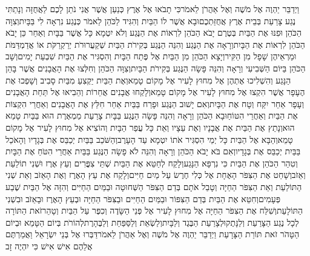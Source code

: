 \documentclass[../main/main.tex]{subfiles}
\begin{document}
\begin{multicols*}{\ncols}
וַיְדַבֵּר יַהְוֶה אֶל מֹשֶׁה וְאֶל אַהֲרֹן לֵאמֹר\PreVerseSpace{}כִּי תָבֹאוּ אֶל אֶרֶץ כְּנַעַן אֲשֶׁר אֲנִי נֹתֵן לָכֶם לַאֲחֻזָּה וְנָתַתִּי נֶגַע צָרַעַת בְּבֵית אֶרֶץ אֲחֻזַּתְכֶם\PreVerseSpace{}וּבָא אֲשֶׁר לוֹ הַבַּיִת וְהִגִּיד לַכֹּהֵן לֵאמֹר כְּנֶגַע נִרְאָה לִי בַּבָּיִת\PreVerseSpace{}וְצִוָּה הַכֹּהֵן וּפִנּוּ אֶת הַבַּיִת בְּטֶרֶם יָבֹא הַכֹּהֵן לִרְאוֹת אֶת הַנֶּגַע וְלֹא יִטְמָא כָּל אֲשֶׁר בַּבָּיִת וְאַחַר כֵּן יָבֹא הַכֹּהֵן לִרְאוֹת אֶת הַבָּיִת\PreVerseSpace{}וְרָאָה אֶת הַנֶּגַע וְהִנֵּה הַנֶּגַע בְּקִירֹת הַבַּיִת שְׁקַעֲרוּרֹת יְרַקְרַקֹּת אוֹ אֲדַמְדַּמֹּת וּמַרְאֵיהֶן שָׁפָל מִן הַקִּיר\PreVerseSpace{}וְיָצָא הַכֹּהֵן מִן הַבַּיִת אֶל פֶּתַח הַבָּיִת וְהִסְגִּיר אֶת הַבַּיִת שִׁבְעַת יָמִים\PreVerseSpace{}וְשָׁב הַכֹּהֵן בַּיּוֹם הַשְּׁבִיעִי וְרָאָה וְהִנֵּה פָּשָׂה הַנֶּגַע בְּקִירֹת הַבָּיִת\PreVerseSpace{}וְצִוָּה הַכֹּהֵן וְחִלְּצוּ אֶת הָאֲבָנִים אֲשֶׁר בָּהֵן הַנָּגַע וְהִשְׁלִיכוּ אֶתְהֶן אֶל מִחוּץ לָעִיר אֶל מָקוֹם טָמֵא\PreVerseSpace{}וְאֶת הַבַּיִת יַקְצִעַ מִבַּיִת סָבִיב וְשָׁפְכוּ אֶת הֶעָפָר אֲשֶׁר הִקְצוּ אֶל מִחוּץ לָעִיר אֶל מָקוֹם טָמֵא\PreVerseSpace{}וְלָקְחוּ אֲבָנִים אֲחֵרוֹת וְהֵבִיאוּ אֶל תַּחַת הָאֲבָנִים וְעָפָר אַחֵר יִקַּח וְטָח אֶת הַבָּיִת\PreVerseSpace{}וְאִם יָשׁוּב הַנֶּגַע וּפָרַח בַּבַּיִת אַחַר חִלֵּץ אֶת הָאֲבָנִים וְאַחֲרֵי הִקְצוֹת אֶת הַבַּיִת וְאַחֲרֵי הִטּוֹחַ\PreVerseSpace{}וּבָא הַכֹּהֵן וְרָאָה וְהִנֵּה פָּשָׂה הַנֶּגַע בַּבָּיִת צָרַעַת מַמְאֶרֶת הוּא בַּבַּיִת טָמֵא הוּא\PreVerseSpace{}וְנָתַץ אֶת הַבַּיִת אֶת אֲבָנָיו וְאֶת עֵצָיו וְאֵת כָּל עֲפַר הַבָּיִת וְהוֹצִיא אֶל מִחוּץ לָעִיר אֶל מָקוֹם טָמֵא\PreVerseSpace{}וְהַבָּא אֶל הַבַּיִת כָּל יְמֵי הִסְגִּיר אֹתוֹ יִטְמָא עַד הָעָרֶב\PreVerseSpace{}וְהַשֹּׁכֵב בַּבַּיִת יְכַבֵּס אֶת בְּגָדָיו וְהָאֹכֵל בַּבַּיִת יְכַבֵּס אֶת בְּגָדָיו\PreVerseSpace{}וְאִם בֹּא יָבֹא הַכֹּהֵן וְרָאָה וְהִנֵּה לֹא פָשָׂה הַנֶּגַע בַּבַּיִת אַחֲרֵי הִטֹּחַ אֶת הַבָּיִת וְטִהַר הַכֹּהֵן אֶת הַבַּיִת כִּי נִרְפָּא הַנָּגַע\PreVerseSpace{}וְלָקַח לְחַטֵּא אֶת הַבַּיִת שְׁתֵּי צִפֳּרִים וְעֵץ אֶרֶז וּשְׁנִי תוֹלַעַת וְאֵזֹב\PreVerseSpace{}וְשָׁחַט אֶת הַצִּפֹּר הָאֶחָת אֶל כְּלִי חֶרֶשׂ עַל מַיִם חַיִּים\PreVerseSpace{}וְלָקַח אֶת עֵץ הָאֶרֶז וְאֶת הָאֵזֹב וְאֵת שְׁנִי הַתּוֹלַעַת וְאֵת הַצִּפֹּר הַחַיָּה וְטָבַל אֹתָם בְּדַם הַצִּפֹּר הַשְּׁחוּטָה וּבַמַּיִם הַחַיִּים וְהִזָּה אֶל הַבַּיִת שֶׁבַע פְּעָמִים\PreVerseSpace{}וְחִטֵּא אֶת הַבַּיִת בְּדַם הַצִּפּוֹר וּבַמַּיִם הַחַיִּים וּבַצִּפֹּר הַחַיָּה וּבְעֵץ הָאֶרֶז וּבָאֵזֹב וּבִשְׁנִי הַתּוֹלָעַת\PreVerseSpace{}וְשִׁלַּח אֶת הַצִּפֹּר הַחַיָּה אֶל מִחוּץ לָעִיר אֶל פְּנֵי הַשָּׂדֶה וְכִפֶּר עַל הַבַּיִת וְטָהֵר\PreVerseSpace{}זֹאת הַתּוֹרָה לְכָל נֶגַע הַצָּרַעַת וְלַנָּתֶק\PreVerseSpace{}וּלְצָרַעַת הַבֶּגֶד וְלַבָּיִת\PreVerseSpace{}וְלַשְׂאֵת וְלַסַּפַּחַת וְלַבֶּהָרֶת\PreVerseSpace{}לְהוֹרֹת בְּיוֹם הַטָּמֵא וּבְיוֹם הַטָּהֹר זֹאת תּוֹרַת הַצָּרָעַת \ClosedSection{}וַיְדַבֵּר יַהְוֶה אֶל מֹשֶׁה וְאֶל אַהֲרֹן לֵאמֹר\PreVerseSpace{}דַּבְּרוּ אֶל בְּנֵי יִשְׂרָאֵל וַאֲמַרְתֶּם אֲלֵהֶם אִישׁ אִישׁ כִּי יִהְיֶה זָב 
\end{multicols*}
\end{document}
